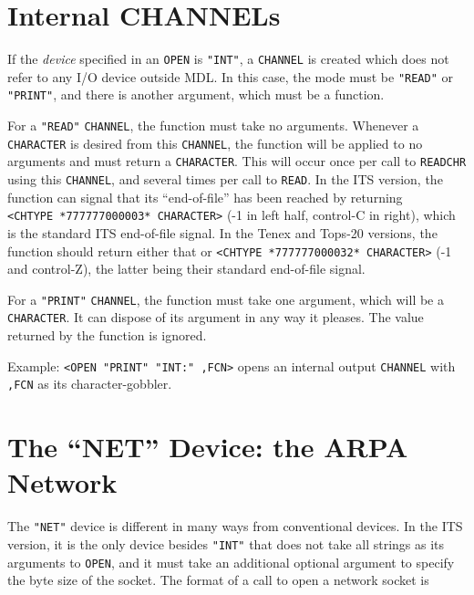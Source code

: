 \documentclass[a4paper]{scrbook}
\begin{document}
\section{Internal CHANNELs}\label{internal-channels}

If the \emph{device} specified in an \texttt{OPEN}  is \texttt{"INT"}, 
a \texttt{CHANNEL} is created which does not refer to any I/O device outside MDL. In this case, the mode must be
\texttt{"READ"} or \texttt{"PRINT"}, and there is another argument, which must be a function.

For a \texttt{"READ"} \texttt{CHANNEL}, the function must take no arguments. Whenever a \texttt{CHARACTER} is desired from
this \texttt{CHANNEL}, the function will be applied to no arguments and must return a \texttt{CHARACTER}. This will occur
once per call to \texttt{READCHR} using this \texttt{CHANNEL}, and several times per call to \texttt{READ}. In the ITS
 version, the function can signal that its ``end-of-file'' has been reached by returning
\texttt{\textless{}CHTYPE\ *777777000003*\ CHARACTER\textgreater{}} (-1 in left half, control-C in right), which is the
standard ITS end-of-file signal. In the Tenex  and Tops-20  versions, the
function should return either that or \texttt{\textless{}CHTYPE\ *777777000032*\ CHARACTER\textgreater{}} (-1 and
control-Z), the latter being their standard end-of-file signal.

For a \texttt{"PRINT"} \texttt{CHANNEL}, the function must take one argument, which will be a \texttt{CHARACTER}. It can
dispose of its argument in any way it pleases. The value returned by the function is ignored.

Example: \texttt{\textless{}OPEN\ "PRINT"\ "INT:"\ ,FCN\textgreater{}} opens an internal output \texttt{CHANNEL} with
\texttt{,FCN} as its character-gobbler.

\section{\texorpdfstring{The ``NET'' Device: the ARPA
Network}{11.10. The NET Device: the ARPA Network}}\label{the-net-device-the-arpa-network}

The \texttt{"NET"}  device is different in many ways from conventional devices. In the ITS
 version, it is the only device besides \texttt{"INT"} that does not take all strings as its arguments
to \texttt{OPEN}, and it must take an additional optional argument to specify the byte size of the
socket. The format of a call to open a network socket is
\end{document}
